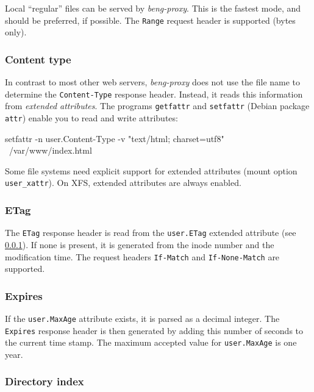 \documentclass[a4paper,12pt]{article}
\begin{document}
Local ``regular'' files can be served by \emph{beng-proxy}.  This is
the fastest mode, and should be preferred, if possible.  The
\texttt{Range} request header is supported (bytes only).

\subsubsection{Content type}

\label{xattr}

In contrast to most other web servers, \emph{beng-proxy} does not use
the file name to determine the \texttt{Content-Type} response header.
Instead, it reads this information from \textit{extended attributes}.
The programs \texttt{getfattr} and \texttt{setfattr} (Debian package
\texttt{attr}) enable you to read and write attributes:

\begin{verbatim*}
setfattr -n user.Content-Type -v "text/html; charset=utf8" \
/var/www/index.html
\end{verbatim*}

Some file systems need explicit support for extended attributes (mount
option \texttt{user\_xattr}).  On
XFS, extended attributes are always enabled.

\subsubsection{ETag}

The \texttt{ETag} response header is read from the \texttt{user.ETag}
extended attribute (see \ref{xattr}).  If none is present, it is
generated from the inode number and the modification time.  The request
headers \texttt{If-Match} and \texttt{If-None-Match} are supported.

\subsubsection{Expires}

If the \texttt{user.MaxAge} attribute exists, it is parsed as a
decimal integer.  The \texttt{Expires} response header is then
generated by adding this number of seconds to the current time stamp.
The maximum accepted value for \texttt{user.MaxAge} is one year.

\subsubsection{Directory index}
\end{document}
